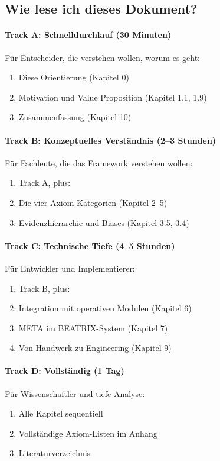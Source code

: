 \subsection*{Wie lese ich dieses Dokument?}

\paragraph{Track A: Schnelldurchlauf (30 Minuten)}
Für Entscheider, die verstehen wollen, worum es geht:
\begin{enumerate}
    \item Diese Orientierung (Kapitel 0)
    \item Motivation und Value Proposition (Kapitel 1.1, 1.9)
    \item Zusammenfassung (Kapitel 10)
\end{enumerate}

\paragraph{Track B: Konzeptuelles Verständnis (2--3 Stunden)}
Für Fachleute, die das Framework verstehen wollen:
\begin{enumerate}
    \item Track A, plus:
    \item Die vier Axiom-Kategorien (Kapitel 2--5)
    \item Evidenzhierarchie und Biases (Kapitel 3.5, 3.4)
\end{enumerate}

\paragraph{Track C: Technische Tiefe (4--5 Stunden)}
Für Entwickler und Implementierer:
\begin{enumerate}
    \item Track B, plus:
    \item Integration mit operativen Modulen (Kapitel 6)
    \item META im BEATRIX-System (Kapitel 7)
    \item Von Handwerk zu Engineering (Kapitel 9)
\end{enumerate}

\paragraph{Track D: Vollständig (1 Tag)}
Für Wissenschaftler und tiefe Analyse:
\begin{enumerate}
    \item Alle Kapitel sequentiell
    \item Vollständige Axiom-Listen im Anhang
    \item Literaturverzeichnis
\end{enumerate}

